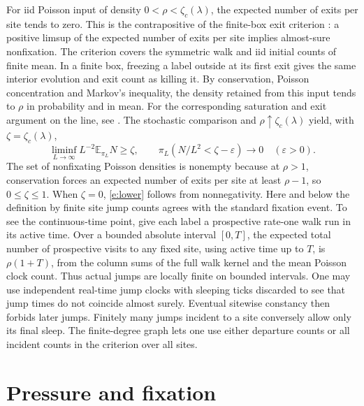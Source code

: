 \documentclass[11pt]{amsart}
\newcommand{\E}{\mathbb E}
\newcommand{\1}{\mathbf 1}
\newcommand{\sr}{\zeta_c}
\begin{document}
For iid Poisson input of density \(0<\rho<\sr(\lambda)\), the expected number of exits per site tends to zero. This is the contrapositive of the finite-box exit criterion \cite[Proposition~3 and \S5]{RT}: a positive limsup of the expected number of exits per site implies almost-sure nonfixation. The criterion covers the symmetric walk and iid initial counts of finite mean. In a finite box, freezing a label outside at its first exit gives the same interior evolution and exit count as killing it. By conservation, Poisson concentration and Markov's inequality, the density retained from this input tends to \(\rho\) in probability and in mean. For the corresponding saturation and exit argument on the line, see \cite[\S5.1]{Forien}. The stochastic comparison and \(\rho\uparrow\sr(\lambda)\) yield, with \(\zeta=\sr(\lambda)\),
\begin{equation}\label{e:lower}
 \liminf_{L\to\infty}L^{-2}\E_{\pi_L}N\ge\zeta,
 \qquad
 \pi_L(N/L^2<\zeta-\varepsilon)\longrightarrow0
 \quad(\varepsilon>0).
\end{equation}
The set of nonfixating Poisson densities is nonempty because at \(\rho>1\), conservation forces an expected number of exits per site at least \(\rho-1\), so \(0\le\zeta\le1\). When \(\zeta=0\), \eqref{e:lower} follows from nonnegativity. Here and below the definition by finite site jump counts agrees with the standard fixation event. To see the continuous-time point, give each label a prospective rate-one walk run in its active time. Over a bounded absolute interval \([0,T]\), the expected total number of prospective visits to any fixed site, using active time up to \(T\), is \(\rho(1+T)\), from the column sums of the full walk kernel and the mean Poisson clock count. Thus actual jumps are locally finite on bounded intervals. One may use independent real-time jump clocks with sleeping ticks discarded to see that jump times do not coincide almost surely. Eventual sitewise constancy then forbids later jumps. Finitely many jumps incident to a site conversely allow only its final sleep. The finite-degree graph lets one use either departure counts or all incident counts in the criterion over all sites.

\section{Pressure and fixation}\label{s:pressure}
\end{document}
